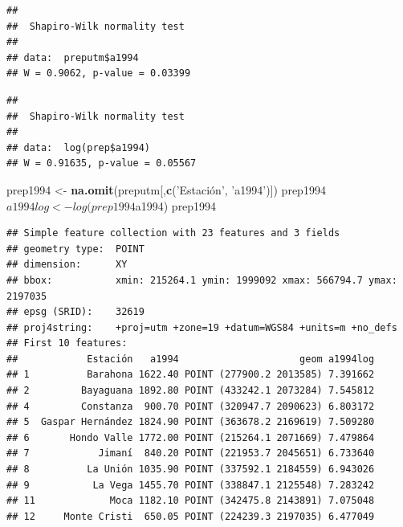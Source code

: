 \documentclass[11pt,]{article}
\newenvironment{Shaded}{\begin{snugshade}}{\end{snugshade}}
\newcommand{\KeywordTok}[1]{\textcolor[rgb]{0.13,0.29,0.53}{\textbf{#1}}}
\newcommand{\StringTok}[1]{\textcolor[rgb]{0.31,0.60,0.02}{#1}}
\newcommand{\OperatorTok}[1]{\textcolor[rgb]{0.81,0.36,0.00}{\textbf{#1}}}
\newcommand{\NormalTok}[1]{#1}
\begin{document}
\begin{verbatim}
## 
##  Shapiro-Wilk normality test
## 
## data:  preputm$a1994
## W = 0.9062, p-value = 0.03399
\end{verbatim}

\begin{Shaded}
\end{Shaded}

\begin{verbatim}
## 
##  Shapiro-Wilk normality test
## 
## data:  log(prep$a1994)
## W = 0.91635, p-value = 0.05567
\end{verbatim}

\begin{Shaded}
\begin{Highlighting}[]
\NormalTok{prep1994 <-}\StringTok{ }\KeywordTok{na.omit}\NormalTok{(preputm[,}\KeywordTok{c}\NormalTok{(}\StringTok{'Estación', '}\NormalTok{a1994}\StringTok{')])}
\StringTok{prep1994$a1994log <- log(prep1994$a1994)}
\StringTok{prep1994}
\end{Highlighting}
\end{Shaded}

\begin{verbatim}
## Simple feature collection with 23 features and 3 fields
## geometry type:  POINT
## dimension:      XY
## bbox:           xmin: 215264.1 ymin: 1999092 xmax: 566794.7 ymax: 2197035
## epsg (SRID):    32619
## proj4string:    +proj=utm +zone=19 +datum=WGS84 +units=m +no_defs
## First 10 features:
##            Estación   a1994                     geom a1994log
## 1          Barahona 1622.40 POINT (277900.2 2013585) 7.391662
## 2         Bayaguana 1892.80 POINT (433242.1 2073284) 7.545812
## 4         Constanza  900.70 POINT (320947.7 2090623) 6.803172
## 5  Gaspar Hernández 1824.90 POINT (363678.2 2169619) 7.509280
## 6       Hondo Valle 1772.00 POINT (215264.1 2071669) 7.479864
## 7            Jimaní  840.20 POINT (221953.7 2045651) 6.733640
## 8          La Unión 1035.90 POINT (337592.1 2184559) 6.943026
## 9           La Vega 1455.70 POINT (338847.1 2125548) 7.283242
## 11             Moca 1182.10 POINT (342475.8 2143891) 7.075048
## 12     Monte Cristi  650.05 POINT (224239.3 2197035) 6.477049
\end{verbatim}
\end{document}
